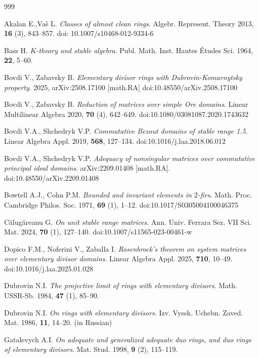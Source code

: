 \documentclass[12pt,a4paper, reqno]{amsart}
\begin{document}
\begin{thebibliography}{999}

Akalan E.,Va\v{s} L. \textit{Classes of almost clean rings}. Algebr. Represent. Theory 2013, \textbf{16} (3), 843--857.
doi: 10.1007/s10468-012-9334-6

Bass H. \textit{$K$-theory and stable algebra}.
Publ. Math. Inst. Hautes \'{E}tudes Sci. 1964, \textbf{22}, 5--60.

Bovdi V., Zabavsky B. \textit{Elementary divisor rings with Dubrovin-Komarnytsky property}.
 2025, arXiv:2508.17100 [math.RA] doi:10.48550/arXiv.2508.17100

Bovdi V., Zabavsky B. \textit{Reduction of matrices over simple Ore domains}.
Linear Multilinear Algebra 2020, \textbf{70} (4), 642--649. doi:10.1080/03081087.2020.1743632

Bovdi V.A., Shchedryk V.P. \textit{Commutative Bezout domains of stable range 1.5}.
Linear Algebra Appl. 2019, \textbf{568}, 127--134. doi:10.1016/j.laa.2018.06.012

Bovdi V.A., Shchedryk V.P. \textit{Adequacy of nonsingular matrices over commutative principal ideal domains}.
arXiv:2209.01408 [math.RA]. doi:10.48550/arXiv.2209.01408

Bowtell A.J., Cohn P.M. \textit{Bounded and invariant elements in $2$-firs}.
Math. Proc. Cambridge Philos. Soc. 1971, \textbf{69} (1), 1--12. doi:10.1017/S0305004100046375

C\u{a}lug\u{a}reanu G. \textit{On unit stable range matrices}.
Ann. Univ. Ferrara Sez. VII Sci. Mat. 2024, \textbf{70} (1), 127--140. doi:10.1007/s11565-023-00461-w

Dopico F.M., Noferini V., Zaballa I. \textit{Rosenbrock's theorem on system matrices over elementary divisor domains}.
Linear Algebra Appl. 2025, \textbf{710}, 10--49. doi:10.1016/j.laa.2025.01.028


Dubrovin N.I. \textit{The projective limit of rings with elementary divisors}.
Math. USSR-Sb. 1984, \textbf{47} (1), 85--90.

Dubrovin N.I. \textit{On rings with elementary divisors}.
Izv. Vyssh. Uchebn. Zaved. Mat. 1986, \textbf{11}, 14--20. (in Russian)

Gatalevych A.I. \textit{On adequate and generalized adequate duo rings, and duo rings of elementary divisors}.
Mat. Stud. 1998, \textbf{9} (2), 115--119.


\end{thebibliography}
\end{document}
